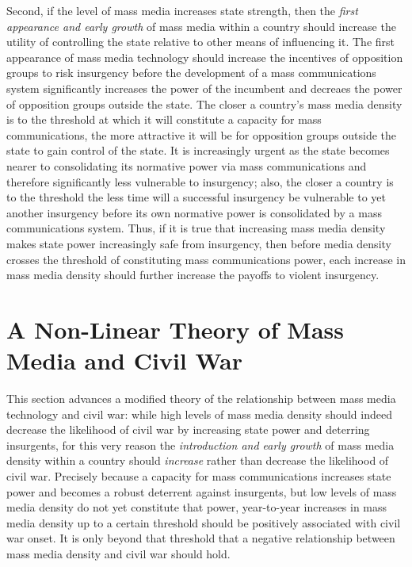 \documentclass[12pt,article,oneside]{memoir}
\begin{document}
Second, if the level of mass media increases state strength, then the
\emph{first appearance and early growth} of mass media within a country
should increase the utility of controlling the state relative to other
means of influencing it. The first appearance of mass media technology
should increase the incentives of opposition groups to risk insurgency
before the development of a mass communications system significantly
increases the power of the incumbent and decreaes the power of
opposition groups outside the state. The closer a country's mass media
density is to the threshold at which it will constitute a capacity for
mass communications, the more attractive it will be for opposition
groups outside the state to gain control of the state. It is
increasingly urgent as the state becomes nearer to consolidating its
normative power via mass communications and therefore significantly less
vulnerable to insurgency; also, the closer a country is to the threshold
the less time will a successful insurgency be vulnerable to yet another
insurgency before its own normative power is consolidated by a mass
communications system. Thus, if it is true that increasing mass media
density makes state power increasingly safe from insurgency, then before
media density crosses the threshold of constituting mass communications
power, each increase in mass media density should further increase the
payoffs to violent insurgency.

\section{A Non-Linear Theory of Mass Media and Civil
War}\label{a-non-linear-theory-of-mass-media-and-civil-war}

This section advances a modified theory of the relationship between mass
media technology and civil war: while high levels of mass media density
should indeed decrease the likelihood of civil war by increasing state
power and deterring insurgents, for this very reason the
\emph{introduction and early growth} of mass media density within a
country should \emph{increase} rather than decrease the likelihood of
civil war. Precisely because a capacity for mass communications
increases state power and becomes a robust deterrent against insurgents,
but low levels of mass media density do not yet constitute that power,
year-to-year increases in mass media density up to a certain threshold
should be positively associated with civil war onset. It is only beyond
that threshold that a negative relationship between mass media density
and civil war should hold.
\end{document}
